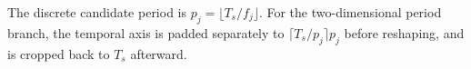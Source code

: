 The discrete candidate period is $p_j=\lfloor T_s/f_j\rfloor$. For the two-dimensional period branch, the temporal axis is padded separately to $\lceil T_s/p_j\rceil p_j$ before reshaping, and is cropped back to $T_s$ afterward.
